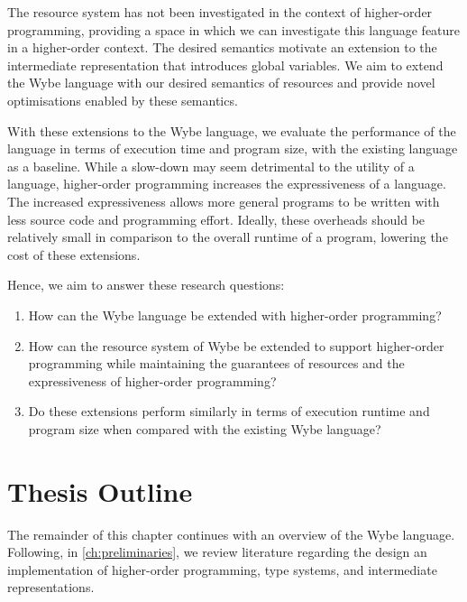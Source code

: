 The resource system has not been investigated in the context of higher-order programming, providing a space in which we can investigate this language feature in a higher-order context. The desired semantics motivate an extension to the intermediate representation that introduces global variables. We aim to extend the Wybe language with our desired semantics of resources and provide novel optimisations enabled by these semantics. 

With these extensions to the Wybe language, we evaluate the performance of the language in terms of execution time and program size, with the existing language as a baseline. While a slow-down may seem detrimental to the utility of a language, higher-order programming increases the expressiveness of a language. The increased expressiveness allows more general programs to be written with less source code and programming effort. Ideally, these overheads should be relatively small in comparison to the overall runtime of a program, lowering the cost of these extensions.

Hence, we aim to answer these research questions:
\begin{enumerate}
  \item How can the Wybe language be extended with higher-order programming?
  \item How can the resource system of Wybe be extended to support higher-order programming while maintaining the guarantees of resources and the expressiveness of higher-order programming?
  \item Do these extensions perform similarly in terms of execution runtime and program size when compared with the existing Wybe language?
\end{enumerate}

\section{Thesis Outline}
\label{sec:doc-outline}

The remainder of this chapter continues with an overview of the Wybe language. Following, in \cref{ch:preliminaries}, we review literature regarding the design an implementation of higher-order programming, type systems, and intermediate representations.
